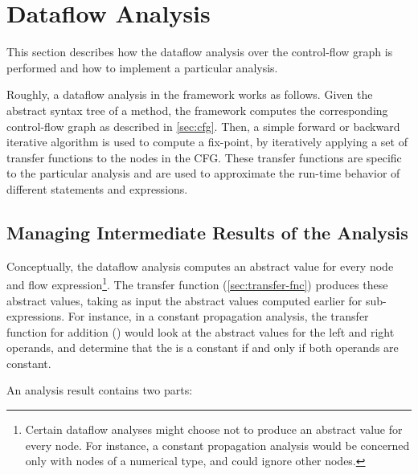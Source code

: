 \section{Dataflow Analysis}

This section describes how the dataflow analysis over the control-flow
graph is performed and how to implement a particular analysis.

Roughly, a dataflow analysis in the framework works as follows. Given
the abstract syntax tree of a method, the framework computes the
corresponding control-flow graph as described in
\autoref{sec:cfg}. Then, a simple forward or backward iterative
algorithm is used to compute a fix-point, by iteratively applying a
set of transfer functions to the nodes in the CFG\@.  These transfer
functions are specific to the particular analysis and are used to
approximate the run-time behavior of different statements and expressions.


\subsection{Managing Intermediate Results of the Analysis}
\label{sec:node-mapping}
\label{sec:store-management}


Conceptually, the dataflow analysis computes an abstract value for
every node and flow expression\footnote{Certain dataflow analyses
  might choose not to produce an abstract value for every node.  For
  instance, a constant propagation analysis would be concerned only
  with nodes of a numerical type, and could ignore other nodes.}.  The
transfer function (\autoref{sec:transfer-fnc}) produces these abstract
values, taking as input the abstract values computed earlier for
sub-expressions.  For instance, in a constant propagation analysis,
the transfer function for addition (\code{+}) would look at the
abstract values for the left and right operands, and determine that the
 is a constant if and only if both operands are
constant.

An analysis result contains two parts:

